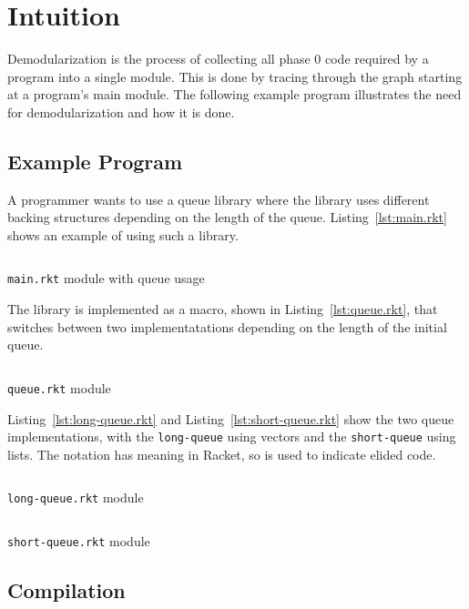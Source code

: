 \chapter{Intuition}
\label{chap:intuition}
Demodularization is the process of collecting all phase 0 code required by a program into a single module.
This is done by tracing through the  graph starting at a program's main module.
The following example program illustrates the need for demodularization and how it is done.

\section{Example Program}
A programmer wants to use a queue library where the library uses different backing structures depending on the length of the queue. 
Listing~\ref{lst:main.rkt} shows an example of using such a library.
\begin{listing}
  \inputminted{racket}{listings/main.rkt}
  \caption{\texttt{main.rkt} module with queue usage}
  \label{lst:main.rkt}
\end{listing}
The library is implemented as a macro, shown in Listing~\ref{lst:queue.rkt}, that switches between two implementatations depending on the length of the initial queue.
\begin{listing}
  \inputminted{racket}{listings/queue.rkt}
  \caption{\texttt{queue.rkt} module}
  \label{lst:queue.rkt}
\end{listing}
Listing~\ref{lst:long-queue.rkt} and Listing~\ref{lst:short-queue.rkt} show the two queue implementations, with the \texttt{long-queue} using vectors and the \texttt{short-queue} using lists. 
The  notation has meaning in Racket, so  is used to indicate elided code.

\begin{listing}
  \inputminted{racket}{listings/long-queue.rkt}
  \caption{\texttt{long-queue.rkt} module}
  \label{lst:long-queue.rkt}
\end{listing}

\begin{listing}
  \inputminted{racket}{listings/short-queue.rkt}
  \caption{\texttt{short-queue.rkt} module}
  \label{lst:short-queue.rkt}
\end{listing}


\section{Compilation}

